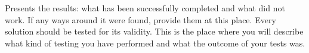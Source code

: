 Presents the results: what has been successfully completed and what did not work.
If any ways around it were found, provide them at this place.
Every solution should be tested for its validity.
This is the place where you will describe what kind of testing you have performed and what the outcome of your tests was.